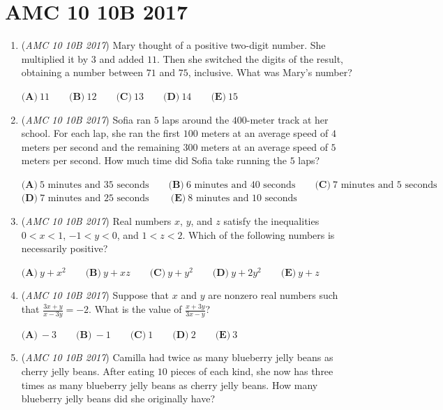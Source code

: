\section{AMC 10 10B 2017}
        \begin{enumerate}
        	\item (\textit{AMC 10 10B 2017}) Mary thought of a positive two-digit number. She multiplied it by $3$ and added $11$. Then she switched the digits of the result, obtaining a number between $71$ and $75$, inclusive. What was Mary's number? 


 $\textbf{(A)}\ 11\qquad\textbf{(B)}\ 12\qquad\textbf{(C)}\ 13\qquad\textbf{(D)}\ 14\qquad\textbf{(E)}\ 15$


	\item (\textit{AMC 10 10B 2017}) Sofia ran $5$ laps around the $400$-meter track at her school. For each lap, she ran the first $100$ meters at an average speed of $4$ meters per second and the remaining $300$ meters at an average speed of $5$ meters per second. How much time did Sofia take running the $5$ laps?


 $\textbf{(A)}\ \text{5 minutes and 35 seconds}\qquad\textbf{(B)}\ \text{6 minutes and 40 seconds}\qquad\textbf{(C)}\ \text{7 minutes and 5 seconds}\qquad$
$\textbf{(D)}\ \text{7 minutes and 25 seconds}\ \qquad\textbf{(E)}\ \text{8 minutes and 10 seconds}$


	\item (\textit{AMC 10 10B 2017}) Real numbers $x$, $y$, and $z$ satisfy the inequalities
$0<x<1$, $-1<y<0$, and $1<z<2$.
Which of the following numbers is necessarily positive?


 $\textbf{(A)}\ y+x^2\qquad\textbf{(B)}\ y+xz\qquad\textbf{(C)}\ y+y^2\qquad\textbf{(D)}\ y+2y^2\qquad\textbf{(E)}\ y+z$


	\item (\textit{AMC 10 10B 2017}) Suppose that $x$ and $y$ are nonzero real numbers such that $\frac{3x+y}{x-3y}=-2$. What is the value of $\frac{x+3y}{3x-y}$?


 $\textbf{(A)}\ -3\qquad\textbf{(B)}\ -1\qquad\textbf{(C)}\ 1\qquad\textbf{(D)}\ 2\qquad\textbf{(E)}\ 3$


	\item (\textit{AMC 10 10B 2017}) Camilla had twice as many blueberry jelly beans as cherry jelly beans. After eating $10$ pieces of each kind, she now has three times as many blueberry jelly beans as cherry jelly beans. How many blueberry jelly beans did she originally have?



\end{enumerate}
